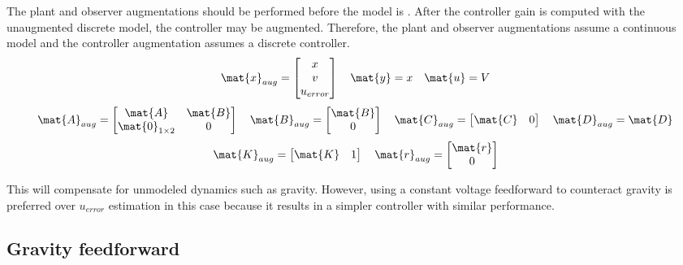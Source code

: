 The \gls{plant} and \gls{observer} augmentations should be performed before the
\gls{model} is . After the \gls{controller}
gain is computed with the unaugmented discrete \gls{model}, the controller may
be augmented. Therefore, the \gls{plant} and \gls{observer} augmentations assume
a continuous \gls{model} and the \gls{controller} augmentation assumes a
discrete \gls{controller}.
\begin{equation*}
  \mat{x}_{aug} =
  \begin{bmatrix}
    x \\
    v \\
    u_{error}
  \end{bmatrix}
  \quad
  \mat{y} = x
  \quad
  \mat{u} = V
\end{equation*}
\begin{equation}
  \mat{A}_{aug} =
  \begin{bmatrix}
    \mat{A} & \mat{B} \\
    \mat{0}_{1 \times 2} & 0
  \end{bmatrix}
  \quad
  \mat{B}_{aug} =
  \begin{bmatrix}
    \mat{B} \\
    0
  \end{bmatrix}
  \quad
  \mat{C}_{aug} = \begin{bmatrix}
    \mat{C} & 0
  \end{bmatrix}
  \quad
  \mat{D}_{aug} = \mat{D}
\end{equation}
\begin{equation}
  \mat{K}_{aug} = \begin{bmatrix}
    \mat{K} & 1
  \end{bmatrix}
  \quad
  \mat{r}_{aug} = \begin{bmatrix}
    \mat{r} \\
    0
  \end{bmatrix}
\end{equation}

This will compensate for unmodeled dynamics such as gravity. However, using a
constant voltage feedforward to counteract gravity is preferred over $u_{error}$
estimation in this case because it results in a simpler controller with similar
performance.

\subsection{Gravity feedforward}

